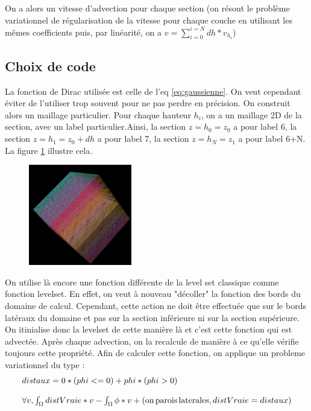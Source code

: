 \documentclass[11pt,a4paper]{article}
\begin{document}
On a alors un vitesse d'advection pour chaque section (on résout le problème variationnel de régularisation de la vitesse pour chaque couche en utilisant les mêmes coefficients puis, par linéarité, on a $v=\sum_{i=0}^{i=N}dh*v_{h_i}$)


\subsection*{Choix de code}
La fonction de Dirac utilisée est celle de l'eq \ref{eq:gaussienne}. On veut cependant éviter de l'utiliser trop souvent pour ne pas perdre en précision. On construit alors un maillage particulier. Pour chaque hauteur $h_i$, on a un maillage 2D de la section, avec un label particulier.Ainsi, la section $z=h_0=z_0$ a pour label 6, la section $z=h_1=z_0+dh$ a pour label 7, la section $z=h_N=z_1$ a pour label 6+N. La figure \ref{fig:maillage} illustre cela.

\begin{figure}[H]
	\label{fig:maillage}
	\centering
	\includegraphics[width=0.4\textwidth]{mesh3D}
	\caption{}
\end{figure}

On utilise là encore une fonction différente de la level set classique comme fonction levelset. En effet, on veut à nouveau "décoller" la fonction des bords du domaine de calcul. Cependant, cette action ne doit être effectuée que sur le bords latéraux du domaine et pas sur la section inférieure ni sur la section supérieure. On itinialise donc la levelset de cette manière là et c'est cette fonction qui est advectée. Après chaque advection, on la recalcule de manière à ce qu'elle vérifie toujours cette propriété.
Afin de calculer cette fonction, on applique un probleme variationnel du type :
\begin{equation}
\begin{array}{l}
distaux=0*(phi<=0)+phi*(phi>0) \\
\\
\forall v, \int_{\Omega}distVraie*v-\int_{\Omega}\phi*v+(\textrm{on\,parois\,laterales},distVraie=distaux)
\end{array}
\end{equation}
\end{document}
